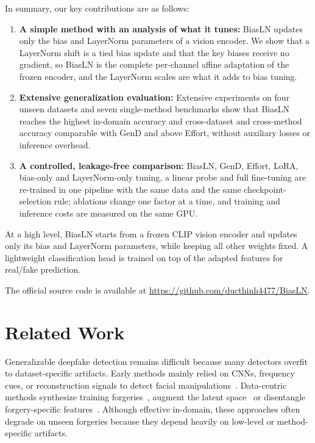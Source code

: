 \documentclass[fonts]{icst}
\newif\ifrevmark\revmarkfalse
\newcommand{\rev}[1]{\ifrevmark{\color{revblue}#1}\else#1\fi}
\begin{document}
In summary, our key contributions are as follows:
\begin{enumerate}
    \item \textbf{A simple \rev{method with an analysis of what it tunes}:} BiasLN updates only the bias and LayerNorm parameters of a vision encoder. \rev{We show that a LayerNorm shift is a tied bias update and that the key biases receive no gradient, so BiasLN is the complete per-channel affine adaptation of the frozen encoder, and the LayerNorm scales are what it adds to bias tuning.}

    \item \textbf{Extensive generalization evaluation:} Extensive experiments on \rev{four} unseen datasets and seven single-method benchmarks \rev{show that BiasLN reaches the highest in-domain accuracy and cross-dataset and cross-method accuracy comparable with GenD and above Effort, without auxiliary losses or inference overhead.}

    \item \rev{\textbf{A controlled, leakage-free comparison:} BiasLN, GenD, Effort, LoRA, bias-only and LayerNorm-only tuning, a linear probe and full fine-tuning are re-trained in one pipeline with the same data and the same checkpoint-selection rule; ablations change one factor at a time, and training and inference costs are measured on the same GPU.}
\end{enumerate}
At a high level, BiasLN starts from a frozen CLIP vision encoder and updates only its bias and LayerNorm parameters, while keeping all other weights fixed.
A lightweight classification head is trained on top of the adapted features for real/fake prediction.

The official source code \rev{is available} at \href{https://github.com/ducthinh4477/BiasLN}{\rev{https://github.com/ducthinh4477/BiasLN}}.

\section{Related Work}

Generalizable deepfake detection remains difficult because many detectors overfit to dataset-specific artifacts. Early methods mainly relied on CNNs, frequency cues, or reconstruction signals to detect facial manipulations~\cite{rossler2019ff,qian2020frequency,luo2021srm,liu2021spsl,cao2022recce,badr2025wavit}. \rev{Data-centric methods synthesize training forgeries~\cite{shiohara2022sbi,chen2022sladd,lin2024cdfa}, augment the latent space~\cite{yan2024latent} or disentangle forgery-specific features~\cite{yan2023ucf,huang2023iid}.} Although effective in-domain, these approaches often degrade on unseen forgeries because they depend heavily on low-level or method-specific artifacts.
\end{document}

